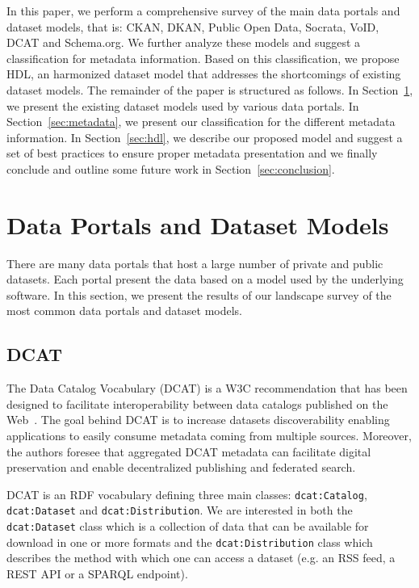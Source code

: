 \documentclass[runningheads,a4paper]{../../Tools/LaTEX/llncs}
\begin{document}
In this paper, we perform a comprehensive survey of the main data portals and dataset models, that is: CKAN, DKAN, Public Open Data, Socrata, VoID, DCAT and Schema.org. We further analyze these models and suggest a classification for metadata information. Based on this classification, we propose HDL, an harmonized dataset model that addresses the shortcomings of existing dataset models. The remainder of the paper is structured as follows. In Section~\ref{sec:models}, we present the existing dataset models used by various data portals. In Section~\ref{sec:metadata}, we present our classification for the different metadata information. In Section~\ref{sec:hdl}, we describe our proposed model and suggest a set of best practices to ensure proper metadata presentation and we finally conclude and outline some future work in Section~\ref{sec:conclusion}.


\section{Data Portals and Dataset Models}
\label{sec:models}
There are many data portals that host a large number of private and public datasets. Each portal present the data based on a model used by the underlying software. In this section, we present the results of our landscape survey of the most common data portals and dataset models.

\subsection{DCAT}
The Data Catalog Vocabulary (DCAT) is a W3C recommendation that has been designed to facilitate interoperability between data catalogs published on the Web~\cite{Erickson:DCV:14}. The goal behind DCAT is to increase datasets discoverability enabling applications to easily consume metadata coming from multiple sources. Moreover, the authors foresee that aggregated DCAT metadata can facilitate digital preservation and enable decentralized publishing and federated search.

DCAT is an RDF vocabulary defining three main classes: \texttt{dcat:Catalog}, \texttt{dcat:Dataset} and \texttt{dcat:Distribution}. We are interested in both the \texttt{dcat:Dataset} class which is a collection of data that can be available for download in one or more formats and the \texttt{dcat:Distribution} class which describes the method with which one can access a dataset (e.g. an RSS feed, a REST API or a SPARQL endpoint).
\end{document}
